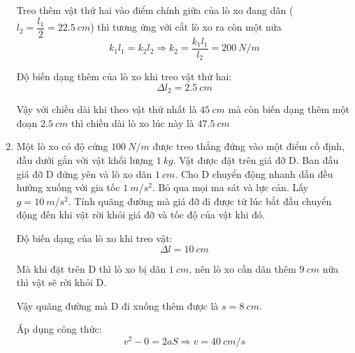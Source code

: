 \begin{enumerate}[label=\bfseries Câu \arabic*:]
{	Treo thêm vật thứ hai vào điểm chính giữa của lò xo đang dãn ($l_2 = \dfrac{l_1}{2} = \SI{22.5}{cm}$) thì tương ứng với cắt lò xo ra còn một nửa 
	$$k_1l_1= k_2 l_2 \Rightarrow k_2 = \dfrac{k_1l_1}{l_2} = \SI{200}{N/m}$$
	
	Độ biến dạng thêm của lò xo khi treo vật thứ hai:
	$$\Delta l_2 = \SI{2.5}{cm}$$
	
	Vậy với chiều dài khi theo vật thứ nhất là $\SI{45}{cm}$ mà còn biến dạng thêm một đoạn $\SI{2.5}{cm}$ thì chiều dài lò xo lúc này là $\SI{47.5}{cm}$
	
	}
	\item {}
	
	\cauhoi
	{Một lò xo có độ cứng $\SI{100}{N/m}$ được treo thẳng đứng vào một điểm cố định, đầu dưới gắn với vật khối lượng $\SI{1}{kg}$. Vật được đặt trên giá đỡ D. Ban đầu giá đỡ D đứng yên và lò xo dãn $\SI{1}{cm}$. Cho D chuyển động nhanh dần đều hướng xuống với gia tốc $\SI{1}{m/s^2}$. Bỏ qua mọi ma sát và lực cản. Lấy $g=\SI{10}{m/s^2}$. Tính quãng đường mà giá đỡ đi được từ lúc bắt đầu chuyển động đến khi vật rời khỏi giá đỡ và tốc độ của vật khi đó.
	}
	
	\loigiai
	{Độ biến dạng của lò xo khi treo vật:
		$$\Delta l = \SI{10}{cm}$$
		
		Mà khi đặt trên D thì lò xo bị dãn $\SI{1}{cm}$, nên lò xo cần dãn thêm $\SI{9}{cm}$ nữa thì vật sẽ rời khỏi D.
		
		Vậy quãng đường mà D đi xuống thêm được là $s=\SI{8}{cm}$.
		
	Áp dụng công thức:
	$$v^2 -0 = 2aS \Rightarrow v = \SI{40}{cm/s}$$
	}
\end{enumerate}